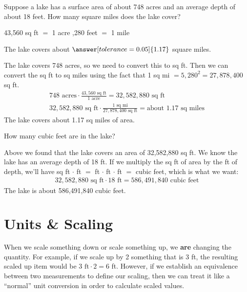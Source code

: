 \documentclass[12pt]{ximera}
\begin{document}
\begin{problem}
Suppose a lake has a surface area of about 748 acres and an average depth of about 18
feet. How many square miles does the lake cover?

\hspace{1em} 43,560 sq ft $=$ 1 acre ,280 feet $=$ 1 mile

The lake covers about $\answer[tolerance=0.05]{1.17}$ square miles.

\begin{solution}
The lake covers 748 acres, so we need to convert this to sq ft. Then we can convert the
sq ft to sq miles using the fact that 1 sq mi $= 5{,}280^{2} = 27{,}878{,}400$ sq ft.
\begin{gather*}
748\text{ acres} \cdot \frac{43{,}560\text{ sq ft}}{1\text{ acre}} = 32{,}582{,}880\text{ sq ft} \\
32{,}582{,}880\text{ sq ft} \cdot \frac{1\text{ sq mi}}{27{,}878{,}400\text{ sq ft}}
= \text{about } 1.17\text{ sq miles}
\end{gather*}
The lake covers about 1.17 sq miles of area.
\end{solution}
\end{problem}

\begin{problem}
How many cubic feet are in the lake?

\begin{freeResponse}
\end{freeResponse}

\begin{solution}
Above we found that the lake covers an area of 32,582,880 sq ft. We know the lake has
an average depth of 18 ft. If we multiply the sq ft of area by the ft of depth, we'll
have sq ft $\cdot$ ft $=$ ft $\cdot$ ft $\cdot$ ft $=$ cubic feet, which is what we
want:
\begin{gather*}
32{,}582{,}880\text{ sq ft} \cdot 18\text{ ft} = 586{,}491{,}840\text{ cubic feet}
\end{gather*}
The lake is about 586,491,840 cubic feet.
\end{solution}
\end{problem}

\section*{Units \& Scaling}

When we scale something down or scale something up, we \textbf{are} changing the
quantity. For example, if we scale up by 2 something that is 3 ft, the resulting scaled
up item would be $3\text{ ft} \cdot 2 = 6$ ft. However, if we establish an equivalence
between two measurements to define our scaling, then we can treat it like a ``normal''
unit conversion in order to calculate scaled values.
\end{document}
